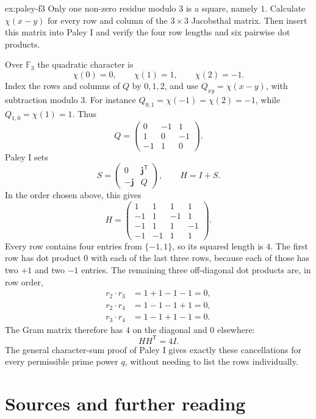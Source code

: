 \begin{solution}{ex:paley-f3}
\idea Only one non-zero residue modulo $3$ is a square, namely $1$. Calculate $\chi(x-y)$ for every row and column of the $3\times3$ Jacobsthal matrix. Then insert this matrix into Paley I and verify the four row lengths and six pairwise dot products.

\writeup Over $\mathbb F_3$ the quadratic character is
\[
\chi(0)=0,\qquad \chi(1)=1,\qquad\chi(2)=-1.
\]
Index the rows and columns of $Q$ by $0,1,2$, and use $Q_{xy}=\chi(x-y)$, with subtraction modulo $3$. For instance $Q_{0,1}=\chi(-1)=\chi(2)=-1$, while $Q_{1,0}=\chi(1)=1$. Thus
\[
Q=\begin{pmatrix}
0&-1&1\\
1&0&-1\\
-1&1&0
\end{pmatrix}.
\]
Paley I sets
\[
S=\begin{pmatrix}0&\mathbf j^{\mathsf T}\\-\mathbf j&Q\end{pmatrix},
\qquad H=I+S.
\]
In the order chosen above, this gives
\[
H=\begin{pmatrix}
1&1&1&1\\
-1&1&-1&1\\
-1&1&1&-1\\
-1&-1&1&1
\end{pmatrix}.
\]
Every row contains four entries from $\{-1,1\}$, so its squared length is $4$. The first row has dot product $0$ with each of the last three rows, because each of those has two $+1$ and two $-1$ entries. The remaining three off-diagonal dot products are, in row order,
\[
\begin{aligned}
r_2\cdot r_3&=1+1-1-1=0,\\
r_2\cdot r_4&=1-1-1+1=0,\\
r_3\cdot r_4&=1-1+1-1=0.
\end{aligned}
\]
The Gram matrix therefore has $4$ on the diagonal and $0$ elsewhere:
\[
HH^{\mathsf T}=4I.
\]
The general character-sum proof of Paley I gives exactly these cancellations for every permissible prime power $q$, without needing to list the rows individually.
\end{solution}

\section*{Sources and further reading}

